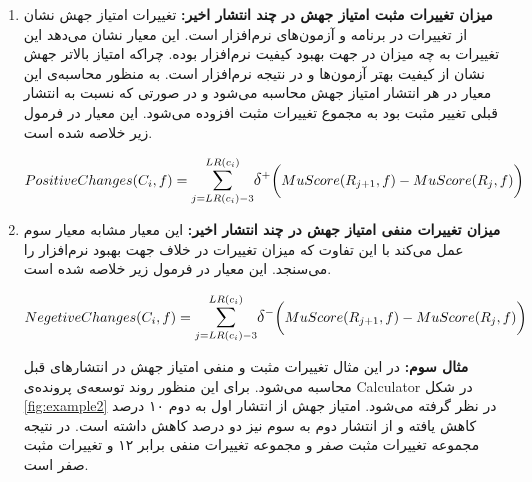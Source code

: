 \begin{enumerate}
	\item 
	\textbf{
		میزان تغییرات مثبت امتیاز جهش  در چند انتشار اخیر:}
	تغییرات امتیاز جهش نشان از تغییرات در برنامه و آزمون‌های نرم‌افزار است. این معیار نشان می‌دهد این تغییرات به چه میزان در جهت بهبود کیفیت نرم‌افزار بوده. چراکه امتیاز بالاتر جهش نشان از کیفیت بهتر آزمون‌ها و در نتیجه نرم‌افزار است.  به منظور محاسبه‌ی این معیار در هر انتشار امتیاز جهش محاسبه می‌شود و در صورتی که نسبت به انتشار قبلی تغییر مثبت  بود به مجموع تغییرات  مثبت  افزوده می‌شود. این معیار در فرمول زیر خلاصه شده است.
\begin{latin}
\[
PositiveChanges(C_i,f) = \mathlarger{\sum}\limits_{j=LR(c_i)-3}^{LR(c_i)} 
\mathlarger{\delta}^+\bigg(MuScore(R_{j+1},f) - MuScore(R_j,f)\bigg) 
\]
\end{latin}	


	\item 
	\textbf{
		میزان تغییرات منفی امتیاز جهش در چند انتشار اخیر:}
	این معیار مشابه معیار سوم عمل می‌کند با این تفاوت که میزان تغییرات در خلاف جهت بهبود نرم‌افزار را می‌سنجد. این معیار در فرمول زیر خلاصه شده است.
\begin{latin}
	\[
	NegetiveChanges(C_i,f) = \mathlarger{\sum}\limits_{j=LR(c_i)-3}^{LR(c_i)} 
	\mathlarger{\delta}^-\bigg(MuScore(R_{j+1},f) - MuScore(R_j,f)\bigg) 
	\]
\end{latin}	
\textbf{مثال سوم:}
در این مثال تغییرات مثبت و منفی امتیاز جهش در انتشارهای قبل محاسبه می‌شود. برای این منظور روند توسعه‌ی پرونده‌ی Calculator در شکل \ref{fig:example2}  در نظر گرفته می‌شود. امتیاز جهش از انتشار اول به دوم ۱۰ درصد کاهش یافته و از انتشار دوم به سوم نیز دو درصد کاهش داشته است. در نتیجه مجموعه تغییرات مثبت صفر و مجموعه تغییرات منفی برابر ۱۲ و تغییرات مثبت صفر است. 
	
\end{enumerate}


